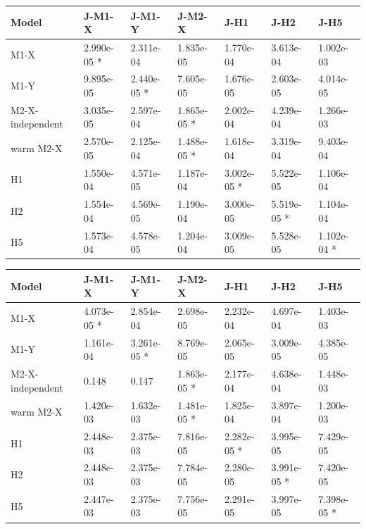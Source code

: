\begin{tabular}{lllllll}
\toprule
Model & J-M1-X & J-M1-Y & J-M2-X & J-H1 & J-H2 & J-H5 \\
\midrule
M1-X & 2.990e-05 * & 2.311e-04 & 1.835e-05 & 1.770e-04 & 3.613e-04 & 1.002e-03 \\
M1-Y & 9.895e-05 & 2.440e-05 * & 7.605e-05 & 1.676e-05 & 2.603e-05 & 4.014e-05 \\
M2-X-independent & 3.035e-05 & 2.597e-04 & 1.865e-05 * & 2.002e-04 & 4.239e-04 & 1.266e-03 \\
warm M2-X & 2.570e-05 & 2.125e-04 & 1.488e-05 * & 1.618e-04 & 3.319e-04 & 9.403e-04 \\
H1 & 1.550e-04 & 4.571e-05 & 1.187e-04 & 3.002e-05 * & 5.522e-05 & 1.106e-04 \\
H2 & 1.554e-04 & 4.569e-05 & 1.190e-04 & 3.000e-05 & 5.519e-05 * & 1.104e-04 \\
H5 & 1.573e-04 & 4.578e-05 & 1.204e-04 & 3.009e-05 & 5.528e-05 & 1.102e-04 * \\
\bottomrule
\end{tabular}

\begin{tabular}{lllllll}
\toprule
Model & J-M1-X & J-M1-Y & J-M2-X & J-H1 & J-H2 & J-H5 \\
\midrule
M1-X & 4.073e-05 * & 2.854e-04 & 2.698e-05 & 2.232e-04 & 4.697e-04 & 1.403e-03 \\
M1-Y & 1.161e-04 & 3.261e-05 * & 8.769e-05 & 2.065e-05 & 3.009e-05 & 4.385e-05 \\
M2-X-independent & 0.148 & 0.147 & 1.863e-05 * & 2.177e-04 & 4.638e-04 & 1.448e-03 \\
warm M2-X & 1.420e-03 & 1.632e-03 & 1.481e-05 * & 1.825e-04 & 3.897e-04 & 1.200e-03 \\
H1 & 2.448e-03 & 2.375e-03 & 7.816e-05 & 2.282e-05 * & 3.995e-05 & 7.429e-05 \\
H2 & 2.448e-03 & 2.375e-03 & 7.784e-05 & 2.280e-05 & 3.991e-05 * & 7.420e-05 \\
H5 & 2.447e-03 & 2.375e-03 & 7.756e-05 & 2.291e-05 & 3.997e-05 & 7.398e-05 * \\
\bottomrule
\end{tabular}

